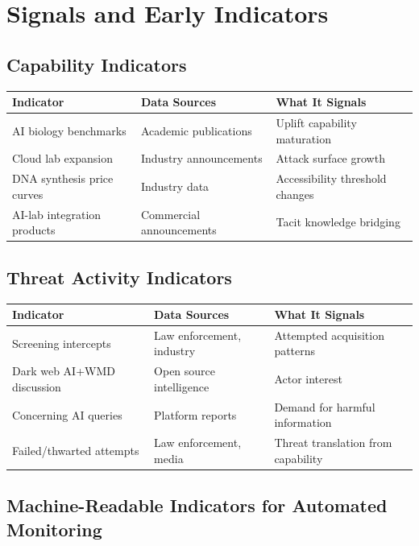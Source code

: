\documentclass[11pt,letterpaper]{article}
\begin{document}
\section{Signals and Early Indicators}

\subsection{Capability Indicators}

\begin{center}
\small
\begin{tabular}{L{4cm}L{4cm}L{4cm}}
\toprule
\textbf{Indicator} & \textbf{Data Sources} & \textbf{What It Signals} \\
\midrule
AI biology benchmarks & Academic publications & Uplift capability maturation \\
Cloud lab expansion & Industry announcements & Attack surface growth \\
DNA synthesis price curves & Industry data & Accessibility threshold changes \\
AI-lab integration products & Commercial announcements & Tacit knowledge bridging \\
\bottomrule
\end{tabular}
\end{center}

\subsection{Threat Activity Indicators}

\begin{center}
\small
\begin{tabular}{L{4cm}L{4cm}L{4cm}}
\toprule
\textbf{Indicator} & \textbf{Data Sources} & \textbf{What It Signals} \\
\midrule
Screening intercepts & Law enforcement, industry & Attempted acquisition patterns \\
Dark web AI+WMD discussion & Open source intelligence & Actor interest \\
Concerning AI queries & Platform reports & Demand for harmful information \\
Failed/thwarted attempts & Law enforcement, media & Threat translation from capability \\
\bottomrule
\end{tabular}
\end{center}

\subsection{Machine-Readable Indicators for Automated Monitoring}
\end{document}
